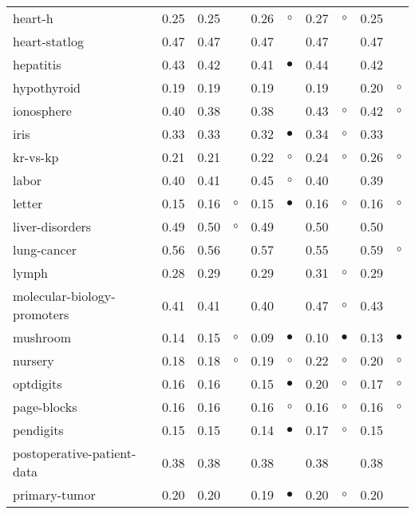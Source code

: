 \begin{table}[thb]
{\begin{tabular}{lrr@{\hspace{0.1cm}}cr@{\hspace{0.1cm}}cr@{\hspace{0.1cm}}cr@{\hspace{0.1cm}}c}
heart-h & 0.25 & 0.25 &           & 0.26 &   $\circ$ & 0.27 &   $\circ$ & 0.25 &          \\
heart-statlog & 0.47 & 0.47 &           & 0.47 &           & 0.47 &           & 0.47 &          \\
hepatitis & 0.43 & 0.42 &           & 0.41 & $\bullet$ & 0.44 &           & 0.42 &          \\
hypothyroid & 0.19 & 0.19 &           & 0.19 &           & 0.19 &           & 0.20 &   $\circ$\\
ionosphere & 0.40 & 0.38 &           & 0.38 &           & 0.43 &   $\circ$ & 0.42 &   $\circ$\\
iris & 0.33 & 0.33 &           & 0.32 & $\bullet$ & 0.34 &   $\circ$ & 0.33 &          \\
kr-vs-kp & 0.21 & 0.21 &           & 0.22 &   $\circ$ & 0.24 &   $\circ$ & 0.26 &   $\circ$\\
labor & 0.40 & 0.41 &           & 0.45 &   $\circ$ & 0.40 &           & 0.39 &          \\
letter & 0.15 & 0.16 &   $\circ$ & 0.15 & $\bullet$ & 0.16 &   $\circ$ & 0.16 &   $\circ$\\
liver-disorders & 0.49 & 0.50 &   $\circ$ & 0.49 &           & 0.50 &           & 0.50 &          \\
lung-cancer & 0.56 & 0.56 &           & 0.57 &           & 0.55 &           & 0.59 &   $\circ$\\
lymph & 0.28 & 0.29 &           & 0.29 &           & 0.31 &   $\circ$ & 0.29 &          \\
molecular-biology-promoters & 0.41 & 0.41 &           & 0.40 &           & 0.47 &   $\circ$ & 0.43 &          \\
mushroom & 0.14 & 0.15 &   $\circ$ & 0.09 & $\bullet$ & 0.10 & $\bullet$ & 0.13 & $\bullet$\\
nursery & 0.18 & 0.18 &   $\circ$ & 0.19 &   $\circ$ & 0.22 &   $\circ$ & 0.20 &   $\circ$\\
optdigits & 0.16 & 0.16 &           & 0.15 & $\bullet$ & 0.20 &   $\circ$ & 0.17 &   $\circ$\\
page-blocks & 0.16 & 0.16 &           & 0.16 &   $\circ$ & 0.16 &   $\circ$ & 0.16 &   $\circ$\\
pendigits & 0.15 & 0.15 &           & 0.14 & $\bullet$ & 0.17 &   $\circ$ & 0.15 &          \\
postoperative-patient-data & 0.38 & 0.38 &           & 0.38 &           & 0.38 &           & 0.38 &          \\
primary-tumor & 0.20 & 0.20 &           & 0.19 & $\bullet$ & 0.20 &   $\circ$ & 0.20 &          \\

\end{tabular}}
\end{table}
